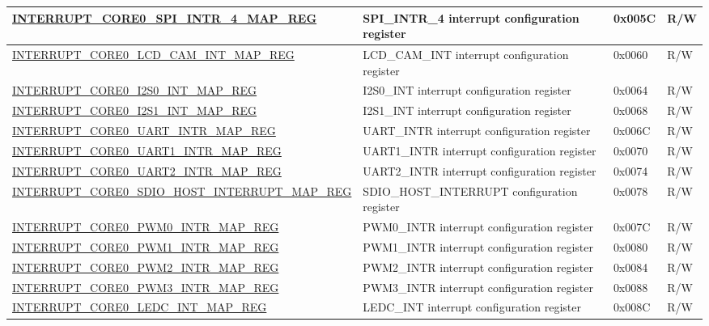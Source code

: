 \begin{landscape}
\begin{longtable}{ | p{10cm} | p{10.2cm} | p{1.3cm} | p{1cm} | }
\hyperref[regdesc:INTERRUPTCORE0SPIINTR4MAPREG]{INTERRUPT\_CORE0\_SPI\_INTR\_4\_MAP\_REG} & SPI\_INTR\_4 interrupt configuration register & 0x005C & R/W \\ \hline
\hyperref[regdesc:INTERRUPTCORE0LCDCAMINTMAPREG]{INTERRUPT\_CORE0\_LCD\_CAM\_INT\_MAP\_REG} & LCD\_CAM\_INT interrupt configuration register & 0x0060 & R/W \\ \hline
\hyperref[regdesc:INTERRUPTCORE0I2S0INTMAPREG]{INTERRUPT\_CORE0\_I2S0\_INT\_MAP\_REG} & I2S0\_INT interrupt configuration register & 0x0064 & R/W \\ \hline
\hyperref[regdesc:INTERRUPTCORE0I2S1INTMAPREG]{INTERRUPT\_CORE0\_I2S1\_INT\_MAP\_REG} & I2S1\_INT interrupt configuration register & 0x0068 & R/W \\ \hline
\hyperref[regdesc:INTERRUPTCORE0UARTINTRMAPREG]{INTERRUPT\_CORE0\_UART\_INTR\_MAP\_REG} & UART\_INTR interrupt configuration register & 0x006C & R/W \\ \hline
\hyperref[regdesc:INTERRUPTCORE0UART1INTRMAPREG]{INTERRUPT\_CORE0\_UART1\_INTR\_MAP\_REG} & UART1\_INTR interrupt configuration register & 0x0070 & R/W \\ \hline
\hyperref[regdesc:INTERRUPTCORE0UART2INTRMAPREG]{INTERRUPT\_CORE0\_UART2\_INTR\_MAP\_REG} & UART2\_INTR interrupt configuration register & 0x0074 & R/W \\ \hline
\hyperref[regdesc:INTERRUPTCORE0SDIOHOSTINTERRUPTMAPREG]{INTERRUPT\_CORE0\_SDIO\_HOST\_INTERRUPT\_MAP\_REG} & SDIO\_HOST\_INTERRUPT configuration register & 0x0078 & R/W \\ \hline
\hyperref[regdesc:INTERRUPTCORE0PWM0INTRMAPREG]{INTERRUPT\_CORE0\_PWM0\_INTR\_MAP\_REG} & PWM0\_INTR interrupt configuration register & 0x007C & R/W \\ \hline
\hyperref[regdesc:INTERRUPTCORE0PWM1INTRMAPREG]{INTERRUPT\_CORE0\_PWM1\_INTR\_MAP\_REG} & PWM1\_INTR interrupt configuration register & 0x0080 & R/W \\ \hline
\hyperref[regdesc:INTERRUPTCORE0PWM2INTRMAPREG]{INTERRUPT\_CORE0\_PWM2\_INTR\_MAP\_REG} & PWM2\_INTR interrupt configuration register & 0x0084 & R/W \\ \hline
\hyperref[regdesc:INTERRUPTCORE0PWM3INTRMAPREG]{INTERRUPT\_CORE0\_PWM3\_INTR\_MAP\_REG} & PWM3\_INTR interrupt configuration register & 0x0088 & R/W \\ \hline
\hyperref[regdesc:INTERRUPTCORE0LEDCINTMAPREG]{INTERRUPT\_CORE0\_LEDC\_INT\_MAP\_REG} & LEDC\_INT interrupt configuration register & 0x008C & R/W \\ \hline

\end{longtable}
\end{landscape}
